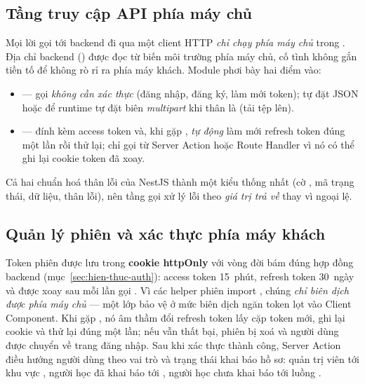 \subsection{Tầng truy cập API phía máy chủ}
\label{subsec:fe-api}

Mọi lời gọi tới backend đi qua một client HTTP \textit{chỉ chạy phía máy chủ}
trong . Địa chỉ backend () được đọc từ
biến môi trường phía máy chủ, cố tình không gắn tiền tố 
để không rò rỉ ra phía máy khách. Module phơi bày hai điểm vào:

\begin{itemize}
  \item {} --- gọi \textit{không cần xác thực} (đăng nhập, đăng
        ký, làm mới token); tự đặt  JSON hoặc để runtime tự
        đặt biên \textit{multipart} khi thân là  (tải tệp lên).
  \item {} --- đính kèm access token và, khi gặp
        , \textit{tự động} làm mới refresh token đúng một lần rồi thử
        lại; chỉ gọi từ Server Action hoặc Route Handler vì nó có thể ghi lại
        cookie token đã xoay.
\end{itemize}

Cả hai chuẩn hoá thân lỗi của NestJS thành một kiểu  thống
nhất (cờ , mã trạng thái, dữ liệu, thân lỗi), nên tầng gọi xử lý lỗi
theo \textit{giá trị trả về} thay vì ngoại lệ.

\subsection{Quản lý phiên và xác thực phía máy khách}
\label{subsec:fe-session}

Token phiên được lưu trong \textbf{cookie httpOnly} với vòng đời bám đúng hợp
đồng backend (mục~\ref{sec:hien-thuc-auth}): access token 15~phút, refresh
token 30~ngày và được xoay sau mỗi lần gọi . Vì các
helper phiên import , chúng \textit{chỉ biên dịch được phía
máy chủ} --- một lớp bảo vệ ở mức biên dịch ngăn token lọt vào Client Component.
Khi  gặp , nó âm thầm đổi refresh token lấy cặp
token mới, ghi lại cookie và thử lại đúng một lần; nếu vẫn thất bại, phiên bị
xoá và người dùng được chuyển về trang đăng nhập. Sau khi xác thực thành công,
Server Action điều hướng người dùng theo vai trò và trạng thái khai báo hồ sơ:
quản trị viên tới khu vực , người học đã khai báo tới
, người học chưa khai báo tới luồng .

